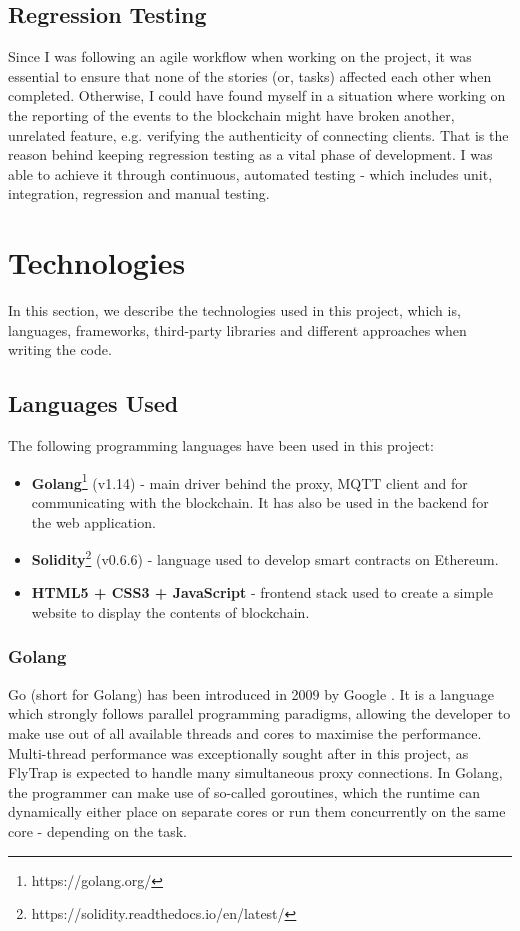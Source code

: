\subsection{Regression Testing}

Since I was following an agile workflow when working on the project, it was essential to ensure that none of the stories (or, tasks) affected each other when completed. Otherwise, I could have found myself in a situation where working on the reporting of the events to the blockchain might have broken another, unrelated feature, e.g. verifying the authenticity of connecting clients. That is the reason behind keeping regression testing as a vital phase of development. I was able to achieve it through continuous, automated testing - which includes unit, integration, regression and manual testing.

\section{Technologies}

In this section, we describe the technologies used in this project, which is, languages, frameworks, third-party libraries and different approaches when writing the code.

\subsection{Languages Used}

The following programming languages have been used in this project:
\begin{itemize}
  \item \textbf{Golang}\footnote{https://golang.org/} (v1.14) - main driver behind the proxy, MQTT client and for communicating with the blockchain. It has also be used in the backend for the web application.
  \item \textbf{Solidity}\footnote{https://solidity.readthedocs.io/en/latest/} (v0.6.6) - language used to develop smart contracts on Ethereum.
 \item \textbf{HTML5 + CSS3 + JavaScript} - frontend stack used to create a simple website to display the contents of blockchain.
\end{itemize}

\subsubsection{Golang}
Go (short for Golang) has been introduced in 2009 by Google \cite{team2009go}. It is a language which strongly follows parallel programming paradigms, allowing the developer to make use out of all available threads and cores to maximise the performance. Multi-thread performance was exceptionally sought after in this project, as FlyTrap is expected to handle many simultaneous proxy connections. In Golang, the programmer can make use of so-called goroutines, which the runtime can dynamically either place on separate cores or run them concurrently on the same core - depending on the task.


